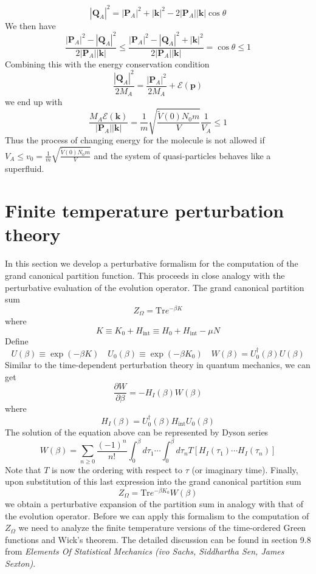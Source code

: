\documentclass[cyan]{elegantnote}
\begin{document}
\[|\bm{Q}_A|^2 = |\bm{P}_A|^2 + |\bm{k}|^2 - 2|\bm{P}_A||\bm{k}|\cos\theta\]
We then have
\[\frac{|\bm{P}_A|^2-|\bm{Q}_A|^2}{2|\bm{P}_A| |\bm{k}|} \leq \frac{|\bm{P}_A|^2-|\bm{Q}_A|^2 + |\bm{k}|^2}{2|\bm{P}_A| |\bm{k}|} = \cos\theta \leq 1\]
Combining this with the energy conservation condition
\[\frac{|\bm{Q}_A|^2}{2M_A} = \frac{|\bm{P}_A|^2}{2M_A} + \mathcal{E}(\bm{p})\]
we end up with
\[\frac{M_A\mathcal{E}(\bm{k})}{|\bm{P}_A| |\bm{k}|} = \frac{1}{m}\sqrt{\frac{\tilde{V}(0)N_0m}{V}} \frac{1}{V_A} \leq 1\]
Thus the process of changing energy for the molecule is not allowed if $V_A \leq v_0 = \frac{1}{m}\sqrt{\frac{\tilde{V}(0)N_0m}{V}} $ and the system of quasi-particles behaves like a superfluid.

\section{Finite temperature perturbation theory}
In this section we develop a perturbative formalism for the computation of the grand canonical partition function. This proceeds in close analogy with the perturbative evaluation of the evolution operator. The grand canonical partition sum 
\[Z_{\Omega} = \mathrm{Tr}e^{-\beta K}\]
where
\[K \equiv K_0 + H_{\mathrm{int}} \equiv H_0 + H_{\mathrm{int}} -\mu N\]
Define
\[U(\beta) \equiv \exp(-\beta K) \quad U_0(\beta) \equiv \exp(-\beta K_0) \quad W(\beta) = U_0^{\dagger}(\beta)U(\beta)\]
Similar to the time-dependent perturbation theory in quantum mechanics, we can get
\[\frac{\partial W}{\partial \beta} = -H_I(\beta)W(\beta)\]
where
\[H_I(\beta) = U_0^{\dagger}(\beta)H_{\mathrm{int}}U_0(\beta)\]
The solution of the equation above can be represented by Dyson series
\[W(\beta) = \sum_{n \geq 0} \frac{(-1)^n}{n!} \int_0^{\beta}d\tau_1 \cdots \int_0^{\beta} d\tau_n T[H_I(\tau_1)\cdots H_I(\tau_n)]\]
Note that $T$ is now the ordering with respect to $\tau$ (or imaginary time). Finally, upon substitution of this last expression into the grand canonical partition sum
\[Z_{\Omega} = \mathrm{Tr} e^{-\beta K_0}W(\beta)\]
we obtain a perturbative expansion of the partition sum in analogy with that of the evolution operator. Before we can apply this formalism to the computation of $Z_{\Omega}$ we need to analyze the finite temperature versions of the time-ordered Green functions and Wick's theorem. The detailed discussion can be found in section 9.8 from \emph{Elements Of Statistical Mechanics (ivo Sachs, Siddhartha Sen, James Sexton)}.
\end{document}
